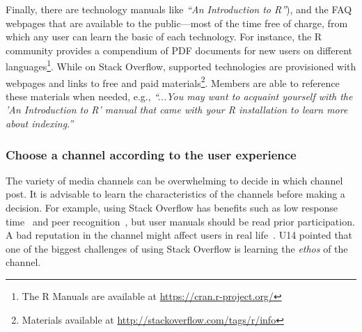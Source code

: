         Finally, there are technology manuals like \textit{``An Introduction to R''}), and the FAQ webpages that are available to the public---most of the time free of charge, from which any user can learn the basic of each technology.
        For instance, the R community provides a compendium of PDF documents for new users on different languages\footnote{The R Manuals are available at \url{https://cran.r-project.org/}}.
        While on Stack Overflow, supported technologies are provisioned with webpages and links to free and paid materials\footnote{Materials available at \url{http://stackoverflow.com/tags/r/info}}.
        Members are able to reference these materials when needed, e.g., \textit{``...You may want to acquaint yourself with the 'An Introduction to R' manual that came with your R installation to learn more about indexing.''}


\subsubsection{Choose a channel according to the user experience}

The variety of media channels can be overwhelming to decide in which channel post.
It is advisable to learn the characteristics of the channels before making a decision.
For example, using Stack Overflow has benefits such as low response time~\cite{Mamykina2011} and peer recognition~\cite{Singer2013}, but user manuals should be read prior participation.
A bad reputation in the channel might affect users in real life~\cite{Singer2013}.
U14 pointed that one of the biggest challenges of using Stack Overflow is learning the \emph{ethos} of the channel.

